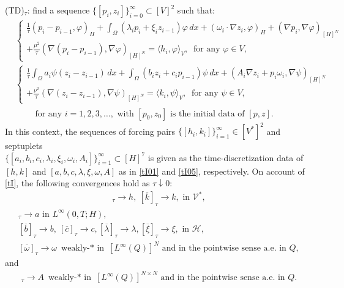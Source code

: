 \documentclass{sinst}
\numberwithin{equation}{section}
\theoremstyle{plain}
\theoremstyle{definition}
\def\sH{\mathscr{H}}
\def\sV{\mathscr{V}}
\begin{document}
\smallskip
(TD)$_\tau$: find a sequence $\{ [p_i, z_i] \}_{i=0}^\infty \subset [V]^2$ such that:
\begin{align}
  &\left\{ \begin{gathered}
    \frac{1}{\tau}(p_i - p_{i-1}, \varphi)_H + \int_\Omega (\lambda_i p_i + \xi_i z_{i-1}) \varphi \,dx + (\omega_i \cdot \nabla z_i, \varphi)_H + (\nabla p_i, \nabla \varphi)_{[H]^N} 
    \\
    + \frac{\mu^2}{\tau} (\nabla (p_i - p_{i-1}), \nabla \varphi)_{[H]^N} = \langle h_i, \varphi\rangle_V, \ \mbox{ for any } \varphi \in V,
  \end{gathered} \right. \label{P_TD1}
  \\
  &\left\{ \begin{gathered}
    \frac{1}{\tau} \int_\Omega a_i \psi (z_i - z_{i-1}) \,dx + \int_\Omega (b_i z_i + c_i p_{i-1}) \psi \,dx + (A_i \nabla z_i + p_i \omega_i, \nabla \psi)_{[H]^N} 
    \\
    + \frac{\nu^2}{\tau} (\nabla(z_i - z_{i-1}), \nabla \psi)_{[H]^N} = \langle k_i, \psi \rangle_V, \ \mbox{ for any } \psi \in V,
  \end{gathered} \right. \label{P_TD2}
  \\
  &\qquad \mbox{ for any } i = 1,2,3,\dots, \mbox{ with $[p_0,z_0]$ is the initial data of $[p,z]$}. 
\end{align}
In this context, the sequences of forcing pairs $\{ [h_i, k_i] \}_{i=1}^\infty \in [V^*]^2$ and septuplets 
\\
$\{ [a_i, b_i, c_i, \lambda_i, \xi_i, \omega_i, A_i] \}_{i=1}^\infty \subset [H]^7$ is given as the time-discretization data of $[h,k]$ and $[a,b,c,\lambda,\xi,\omega,A]$ as in \eqref{tI01} and \eqref{tI05}, respectively. On account of \eqref{tI}, the following convergences hold as $\tau \downarrow 0$:
\begin{gather}
  [\overline{h}]_\tau \to h, \ [\overline{k}]_\tau \to k,  \mbox{ in } \sV^*, 
\end{gather}
\begin{gather}
  [\overline{a}]_\tau \to a \mbox{ in } L^\infty(0,T;H),
  \\
  [\overline{b}]_\tau \to b, \ [\overline{c}]_\tau \to c, [\overline{\lambda}]_\tau \to \lambda, [\overline{\xi}]_\tau \to \xi, \mbox{ in } \sH,
  \\
  [\overline{\omega}]_\tau \to \omega \mbox{ weakly-$*$ in } [L^\infty(Q)]^N \mbox{ and in the pointwise sense a.e. in $Q$},
\end{gather}
and
\begin{gather}
  [\overline{A}]_\tau \to A \mbox{ weakly-$*$ in } [L^\infty(Q)]^{N \times N} \mbox{ and in the pointwise sense a.e. in $Q$}.
\end{gather}
\end{document}
